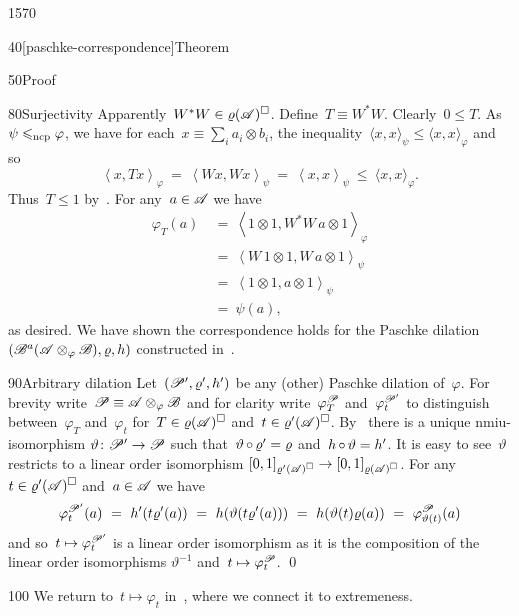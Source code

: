 \begin{parsec}{1570}
\begin{point}{40}[paschke-correspondence]{Theorem}
\begin{point}{50}{Proof}
\begin{point}{80}{Surjectivity}
Apparently~$W^*W \in \varrho(\mathscr{A})^\square$.
Define~$T \equiv W^*W$. Clearly~$0\leq T$.
As~$\psi \mathrel{\leqslant_{\mathrm{ncp}}} \varphi$,
    we have for each~$x \equiv \sum_i a_i \otimes b_i$,
    the inequality~$\langle x,x\rangle_\psi \leq \langle x,x\rangle_\varphi$
    and so
\begin{equation*}
    \left<x, Tx\right>_\varphi \ =\  \left<Wx,Wx\right>_\psi
    \ =\  \left<x,x\right>_\psi \ \leq\  \langle x,x \rangle_\varphi.
\end{equation*}
    Thus~$T \leq 1$ by~.
For any~$a\in \mathscr{A}$ we have
\begin{align*}
    \varphi_T(a) &\ =\  \left<1\otimes 1, W^*W\, a \otimes 1\right>_\varphi \\
    &  \ =\  \left<W\, 1\otimes 1, W\, a\otimes1\right>_\psi \\
    &  \ = \ \left<1\otimes1, a\otimes1\right>_\psi \\
    &  \ = \ \psi(a),
\end{align*}
    as desired.  We have shown the correspondence holds for
    the Paschke dilation~$(\mathscr{B}^a(\mathscr{A} \otimes_\varphi \mathscr{B}), \varrho, h)$
                constructed in~.
\end{point}
\begin{point}{90}{Arbitrary dilation}%
Let~$(\mathscr{P}', \varrho', h')$ be any (other) Paschke dilation
    of~$\varphi$.
For brevity write~$\mathscr{P} \equiv \mathscr{A} \otimes_\varphi \mathscr{B}$
    and for clarity
    write~$\varphi_T^{\mathscr{P}}$
        and~$\varphi_t^{\mathscr{P}'}$
    to distinguish between~$\varphi_T$ and~$\varphi_t$
    for~$T \in \varrho(\mathscr{A})^\square$ and~$t \in \varrho'(\mathscr{A})^\square$.
By~
    there is a unique nmiu-isomorphism
    $\vartheta\colon \mathscr{P}' \to \mathscr{P}$
    such that~$\vartheta \mathop{\circ} \varrho' = \varrho $
    and~$h \mathop{\circ} \vartheta = h'$.
It is easy to see~$\vartheta$ restricts to a linear order isomorphism
    $[0,1]_{\varrho'(\mathscr{A})^\square} \to [0,1]_{\varrho(\mathscr{A})^\square}$.
For any~$t \in \varrho'(\mathscr{A})^\square$ and~$a\in \mathscr{A}$ we have
\begin{equation*}
    \varphi_t^{\mathscr{P}'} (a)
        \ = \ h'(t \varrho'(a))
        \ = \ h(\vartheta(t \varrho'(a)))
        \ = \ h(\vartheta(t) \varrho(a))
        \ = \ \varphi_{\vartheta(t)}^{\mathscr{P}}(a)
\end{equation*}
and so~$t \mapsto \varphi_t^{\mathscr{P}'}$
    is a linear order isomorphism as it
    is the composition of the linear order isomorphisms
    $\vartheta^{-1}$ and~$t \mapsto \varphi_t^{\mathscr{P}}$. \qed
\end{point}
\begin{point}{100}%
We return to~$t \mapsto \varphi_t$
    in~,
    where we connect it to extremeness.
\end{point}
\end{point}
\end{point}
\end{parsec}

